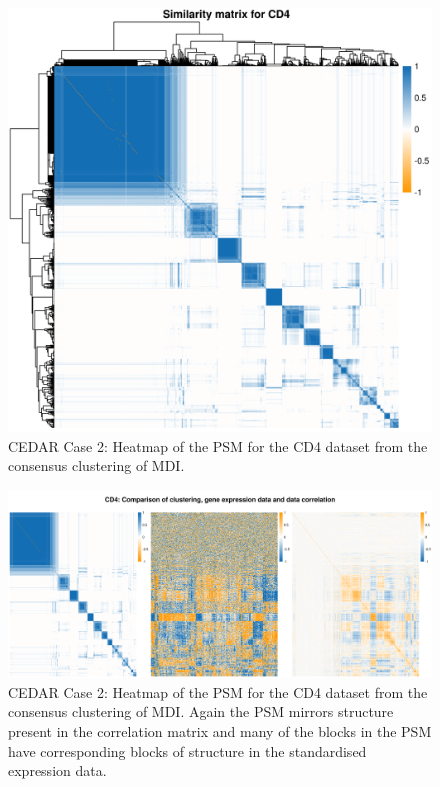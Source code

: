 \documentclass[12pt]{article} %
\begin{document}
	\begin{figure}[h]
		\centering
		\includegraphics[scale=0.75]{Images/Biology_data/Set_1000/All_datasets/Similarity_matrices/similarity_matrix_CD4.png}
		\caption{CEDAR Case 2: Heatmap of the PSM for the CD4 dataset from the consensus clustering of MDI.}
		\label{fig:results:cedar_2:mdi_cd4_psm}
	\end{figure}
	
	
	\begin{figure}
		\centering
		\includegraphics[scale=0.5]{Images/Biology_data/Set_1000/All_datasets/Comparison_expression_clustering_correlation/CD4.png}
		\caption{CEDAR Case 2: Heatmap of the PSM for the CD4 dataset from the consensus clustering of MDI. Again the PSM mirrors structure present in the correlation matrix and many of the blocks in the PSM have corresponding blocks of structure in the standardised expression data.}
		\label{fig:results:cedar_2:mdi_cd4_psm_expr_cor}
	\end{figure}
	
\end{document}
